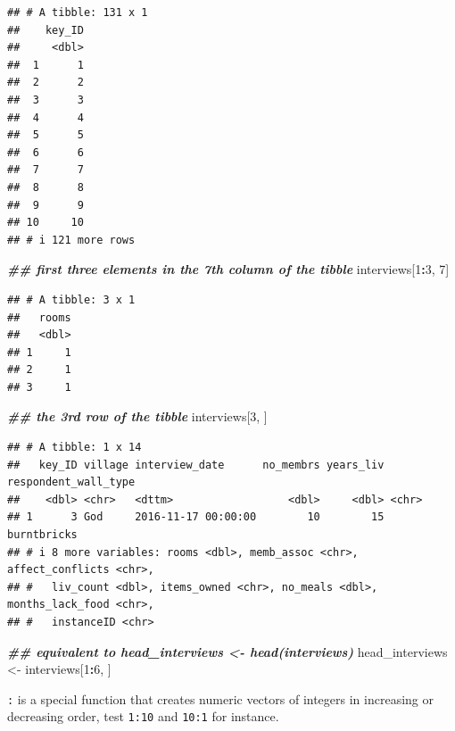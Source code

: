 \documentclass[
]{article}
\newenvironment{Shaded}{\begin{snugshade}}{\end{snugshade}}
\newcommand{\DecValTok}[1]{\textcolor[rgb]{0.00,0.00,0.81}{#1}}
\newcommand{\DocumentationTok}[1]{\textcolor[rgb]{0.56,0.35,0.01}{\textbf{\textit{#1}}}}
\newcommand{\NormalTok}[1]{#1}
\newcommand{\OtherTok}[1]{\textcolor[rgb]{0.56,0.35,0.01}{#1}}
\newcommand{\SpecialCharTok}[1]{\textcolor[rgb]{0.81,0.36,0.00}{\textbf{#1}}}
\begin{document}
\begin{verbatim}
## # A tibble: 131 x 1
##    key_ID
##     <dbl>
##  1      1
##  2      2
##  3      3
##  4      4
##  5      5
##  6      6
##  7      7
##  8      8
##  9      9
## 10     10
## # i 121 more rows
\end{verbatim}

\begin{Shaded}
\begin{Highlighting}[]
\DocumentationTok{\#\# first three elements in the 7th column of the tibble}
\NormalTok{interviews[}\DecValTok{1}\SpecialCharTok{:}\DecValTok{3}\NormalTok{, }\DecValTok{7}\NormalTok{]}
\end{Highlighting}
\end{Shaded}

\begin{verbatim}
## # A tibble: 3 x 1
##   rooms
##   <dbl>
## 1     1
## 2     1
## 3     1
\end{verbatim}

\begin{Shaded}
\begin{Highlighting}[]
\DocumentationTok{\#\# the 3rd row of the tibble}
\NormalTok{interviews[}\DecValTok{3}\NormalTok{, ]}
\end{Highlighting}
\end{Shaded}

\begin{verbatim}
## # A tibble: 1 x 14
##   key_ID village interview_date      no_membrs years_liv respondent_wall_type
##    <dbl> <chr>   <dttm>                  <dbl>     <dbl> <chr>               
## 1      3 God     2016-11-17 00:00:00        10        15 burntbricks         
## # i 8 more variables: rooms <dbl>, memb_assoc <chr>, affect_conflicts <chr>,
## #   liv_count <dbl>, items_owned <chr>, no_meals <dbl>, months_lack_food <chr>,
## #   instanceID <chr>
\end{verbatim}

\begin{Shaded}
\begin{Highlighting}[]
\DocumentationTok{\#\# equivalent to head\_interviews \textless{}{-} head(interviews)}
\NormalTok{head\_interviews }\OtherTok{\textless{}{-}}\NormalTok{ interviews[}\DecValTok{1}\SpecialCharTok{:}\DecValTok{6}\NormalTok{, ]}
\end{Highlighting}
\end{Shaded}

\texttt{:} is a special function that creates numeric vectors of
integers in increasing or decreasing order, test \texttt{1:10} and
\texttt{10:1} for instance.
\end{document}
